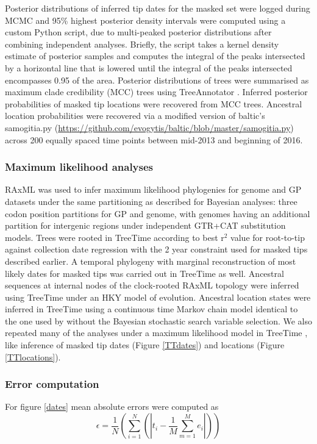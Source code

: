 \documentclass[11pt,oneside,letterpaper]{article}
\begin{document}
Posterior distributions of inferred tip dates for the masked set were logged during MCMC and 95\% highest posterior density intervals were computed using a custom Python script, due to multi-peaked posterior distributions after combining independent analyses.
Briefly, the script takes a kernel density estimate of posterior samples and computes the integral of the peaks intersected by a horizontal line that is lowered until the integral of the peaks intersected encompasses 0.95 of the area.
Posterior distributions of trees were summarised as maximum clade credibility (MCC) trees using TreeAnnotator \citep{suchard_bayesian_2018}.
Inferred posterior probabilities of masked tip locations were recovered from MCC trees.
Ancestral location probabilities were recovered via a modified version of baltic's samogitia.py (\url{https://github.com/evogytis/baltic/blob/master/samogitia.py}) across 200 equally spaced time points between mid-2013 and beginning of 2016.

\subsubsection*{Maximum likelihood analyses}
RAxML \citep{stamatakis_raxml_2014} was used to infer maximum likelihood phylogenies for genome and GP datasets under the same partitioning as described for Bayesian analyses: three codon position partitions for GP and genome, with genomes having an additional partition for intergenic regions under independent GTR+CAT substitution models.
Trees were rooted in TreeTime according to best r$^{2}$ value for root-to-tip against collection date regression with the 2 year constraint used for masked tips described earlier.
A temporal phylogeny with marginal reconstruction of most likely dates for masked tips was carried out in TreeTime \citep{sagulenko_treetime:_2018} as well.
Ancestral sequences at internal nodes of the clock-rooted RAxML topology were inferred using TreeTime under an HKY model \citep{hky_1985} of evolution.
Ancestral location states were inferred in TreeTime using a continuous time Markov chain model identical to the one used by \cite{lemey_bayesian_2009} without the Bayesian stochastic search variable selection.
We also repeated many of the analyses under a maximum likelihood model in TreeTime \citep{sagulenko_treetime:_2018}, like inference of masked tip dates (Figure \ref{TTdates}) and locations (Figure \ref{TTlocations}).


\subsubsection*{Error computation}
For figure \ref{dates} mean absolute errors were computed as
\begin{equation}
    \epsilon = \frac{1}{N} (\sum_{i=1}^{N} (| t_{i} - \frac{1}{M} \sum_{m=1}^{M} e_{i}|))
\end{equation}
\end{document}
